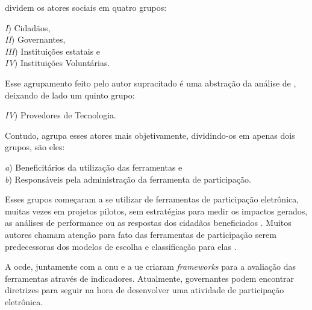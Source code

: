 \par
{} dividem os atores sociais em quatro grupos: 

\begin{minipage}{.66\textwidth}	
   \textit{I}) Cidadãos, \\
   \textit{II}) Governantes, \\
   \textit{III}) Instituições estatais e \\
   \textit{IV}) Instituições Voluntárias. \\
\end{minipage}

\par
Esse agrupamento feito pelo autor supracitado é uma abstração da análise de , deixando de lado um quinto grupo:

\par
\textit{IV}) Provedores de Tecnologia.

\par
Contudo,  agrupa esses atores mais objetivamente, dividindo-os em apenas dois grupos, são eles:\\

\begin{minipage}{.75\textwidth}	
   \textit{a}) Beneficitários da utilização das ferramentas e \\
   \textit{b}) Responsáveis pela administração da ferramenta de participação.  \\
\end{minipage}

Esses grupos começaram a se utilizar de ferramentas de participação eletrônica, muitas vezes em projetos pilotos,
sem estratégias para medir os impactos gerados, as análises de performance ou as respostas dos cidadãos beneficiados \cite{macintosh2008democracy}.
Muitos autores chamam atenção para fato das ferramentas de participação serem predecessoras dos modelos de escolha e classificação para elas 
\cite{millard2006egovernance,macintosh2008democracy,reddick2012public}.

\par
A \acrfull{ocde}, juntamente com a \acrshort{onu} e a \acrfull{ue} criaram \textit{frameworks} para a avaliação das ferramentas através de indicadores. 
Atualmente, governantes podem encontrar diretrizes para seguir na hora de desenvolver uma atividade de participação eletrônica.


